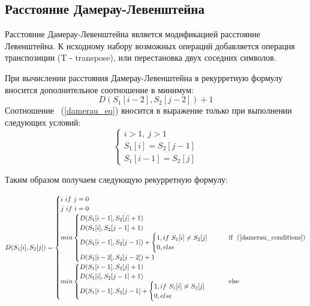 \documentclass[12pt, a4paper]{report}
\begin{document}
	\subsection{Расстояние Дамерау-Левенштейна}
	Расстояние Дамерау-Левенштейна является модификацией расстояние Левенштейна. К исходному набору возможных операций добавляется операция транспозиции (T - transpose), или перестановка двух соседних символов.
	
	При вычислении расстояния Дамерау-Левенштейна в рекурретную формулу вносится дополнительное соотношение в минимум:
	\begin{equation}
	\label{damerau_eq}
	D(S_{1}[i-2], S_{2}[j-2])+1
	\end{equation}
	Соотношение ~(\ref{damerau_eq}) вносится в выражение только при выполнении следующих условий:
	\begin{equation}
	\label{damerau_conditions}
	\begin{cases}
		i > 1,\ j > 1\\
		S_{1}[i] = S_{2}[j-1]\\
		S_{1}[i-1] = S_{2}[j]
	\end{cases}	
	\end{equation}
	
	Таким образом получаем следующую рекурретную формулу:
	
	\begin{equation}
	\label{formula_damerau}
	D(S_{1}[i],S_{2}[j]) = \begin{cases}
	i\ if\ j = 0\\
	j\ if\ i = 0\\
	min \begin{cases}
		D(S_{1}[i-1], S_{2}[j] + 1)\\
		D(S_{1}[i], S_{2}[j-1]+1)\\
		D(S_{1}[i-1], S_{2}[j-1])+
			\begin{cases}
				1, if\  S_{1}[i] \neq S_{2}[j]\\
				0, else
			\end{cases}\\
		D(S_{1}[i-2], S_{2}[j-2])+1
	\end{cases} & \mbox{if ~(\ref{damerau_conditions})}\\	
	min \begin{cases}
		D(S_{1}[i-1], S_{2}[j] + 1)\\
		D(S_{1}[i], S_{2}[j-1]+1)\\
		D(S_{1}[i-1], S_{2}[j-1]+
			\begin{cases}
				1, if\  S_{1}[i] \neq S_{2}[j]\\
				0, else
			\end{cases}
	\end{cases} & \mbox{else}\\
	\end{cases}
	\end{equation}
\end{document}
